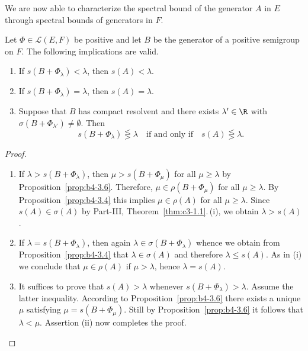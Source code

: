 We are now able to characterize the spectral bound of the generator $A$ in $E$ through spectral bounds of generators in $F$.
\begin{theorem}\label{thm:b4-3.7}
	Let $\Phi \in \mathcal{L}(E,F)$ be positive and let $B$ be the generator of a positive semigroup on $F$. 
	The following implications are valid.
	\begin{enumerate}[\upshape (i)]
		\item If\/ $s(B + \Phi_{\lambda}) < \lambda$, then $s(A) < \lambda$.
        
		\item If\/ $s(B + \Phi_{\lambda}) = \lambda$, then $s(A) = \lambda$.
        
		\item Suppose that $B$ has compact resolvent and there exists $\lambda' \in \R$ with $\sigma(B + \Phi_{\lambda'}) \neq \emptyset$. 
		Then
		\begin{equation}\label{eq:b4-3.6}
		s(B + \Phi_{\lambda}) \lesseqgtr \lambda \quad \text{if and only if} \quad s(A) \lesseqgtr \lambda.
		\end{equation}
	\end{enumerate}
\end{theorem}
\begin{proof}
	\begin{enumerate}[\upshape (i), wide, labelindent=.25em]
	\item 
	If\/ $\lambda > s(B + \Phi_{\lambda})$, then $\mu > s(B + \Phi_{\mu})$ for all $\mu \geq \lambda$ by Proposition~\ref{prop:b4-3.6}.  
	Therefore, $\mu \in \rho(B + \Phi_{\mu})$ for all $\mu \geq \lambda$. 
	By Proposition~\ref{prop:b4-3.4} this implies $\mu \in \rho(A)$ for all $\mu \geq \lambda$. 
	Since $s(A) \in \sigma(A)$ by Part-III, Theorem~\ref{thm:c3-1.1}.\,(i), we obtain $\lambda > s(A)$.
	
    \item 
	If\/ $\lambda = s(B + \Phi_{\lambda})$, then again $\lambda \in \sigma(B + \Phi_{\lambda})$ whence we obtain from Proposition~\ref{prop:b4-3.4} that $\lambda \in \sigma(A)$ and therefore $\lambda \leq s(A)$. 
	As in (i) we conclude that $\mu \in \rho(A)$ if\/ $\mu > \lambda$, hence $\lambda = s(A)$.
	
	\item 
	It suffices to prove that $s(A) > \lambda$ whenever $s(B + \Phi_{\lambda}) > \lambda$. 
	Assume the latter inequality. 
	According to Proposition~\ref{prop:b4-3.6} there exists a unique $\mu$ satisfying $\mu = s(B + \Phi_{\mu})$. 
	Still by Proposition~\ref{prop:b4-3.6} it follows that $\lambda < \mu$. 
	Assertion (ii) now completes the proof.
	\end{enumerate}
\end{proof}
